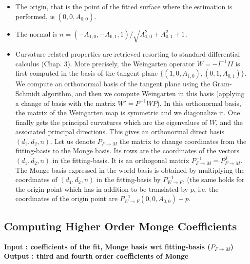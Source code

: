 \begin{ccAdvanced}
\begin{itemize}
\item The origin, that is the point of the fitted surface where the
  estimation is performed, is $(0,0,A_{0,0})$. 
\item The normal is
  $n=(-A_{1,0},-A_{0,1},1)/\sqrt{A_{1,0}^2+A_{0,1}^2+1}$.
\item Curvature related properties are retrieved resorting to
  standard differential calculus \cite{c-dgcs-76} (Chap. 3). More precisely, the
  Weingarten operator $W=-I^{-1}II$ is first computed in the basis of
  the tangent plane $\{ (1,0,A_{1,0}), (0,1,A_{0,1}) \}$. We compute
  an orthonormal basis of the tangent plane using the Gram-Schmidt
  algorithm, and then we compute Weingarten in this basis (applying a
  change of basis with the matrix $W'=P^{-1}WP$). In this orthonormal
  basis, the matrix of the Weingarten map is symmetric and we
  diagonalize it.  One finally gets the principal curvatures which are
  the eigenvalues of $W$, and the associated principal
  directions. This gives an orthonormal direct basis
  $(d_1,d_2,n)$. Let us denote $P_{F \rightarrow M}$ the matrix to
  change coordinates from the fitting-basis to the Monge basis. Its
  rows are the coordinates of the vectors $(d_1,d_2,n)$ in the
  fitting-basis. It is an orthogonal matrix $P_{F \rightarrow
    M}^{-1}=P_{F \rightarrow M}^T$. The Monge basis expressed in the
  world-basis is obtained by multiplying the coordinates of
  $(d_1,d_2,n)$ in the fitting-basis by $P_{W\rightarrow F}^{-1}$,
  (the same holds for the origin point which has in addition to be
  translated by $p$, i.e. the coordinates of the origin point are
  $P_{W\rightarrow F}^{-1} (0,0,A_{0,0}) +p$.
\end{itemize}

\subsection{Computing  Higher Order Monge Coefficients}

{\bf Input : coefficients of the fit, Monge basis wrt fitting-basis ($P_{F
\rightarrow M}$)\\ 
Output : third and fourth order coefficients of Monge}


\end{ccAdvanced}
